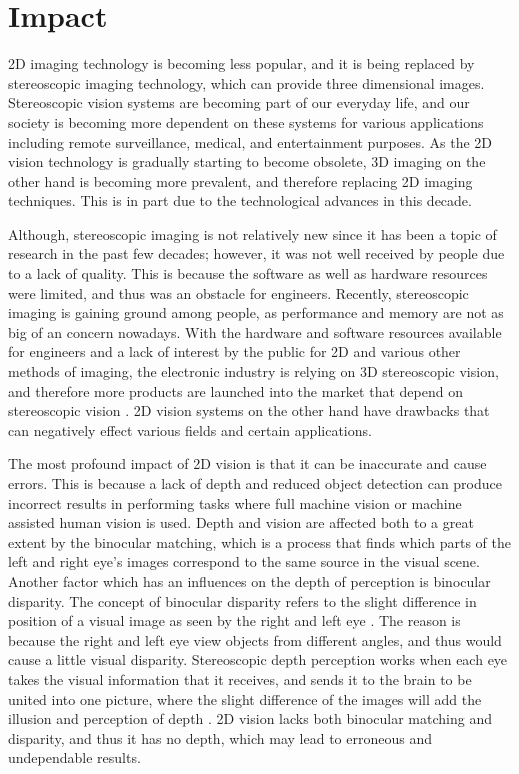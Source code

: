 \documentclass[12pt, journal]{IEEEtran}
\begin{document}
\section{Impact}
2D imaging technology is becoming less popular, and it is being replaced by stereoscopic imaging technology, which can provide three dimensional images. Stereoscopic vision systems are becoming part of our everyday life, and our society is becoming more dependent on these systems for various applications including remote surveillance, medical, and entertainment purposes. As the 2D vision technology is gradually starting to become obsolete, 3D imaging on the other hand is becoming more prevalent, and therefore replacing 2D imaging techniques.  This is in part due to the technological advances in this decade.  

Although, stereoscopic imaging is not relatively new since it has been a topic of research in the past few decades; however, it was not well received by people due to a lack of quality\cite{bryant}. This is because the software as well as hardware resources were limited, and thus was an obstacle for engineers. Recently, stereoscopic imaging is gaining ground among people, as performance and memory are not as big of an concern nowadays. With the hardware and software resources available for engineers and a lack of interest by the public for 2D and various other methods of imaging, the electronic industry is relying on 3D stereoscopic vision, and therefore more products are launched into the market that depend on stereoscopic vision \cite{bryant}. 2D vision systems on the other hand have drawbacks that can negatively effect various fields and certain applications.

The most profound impact of 2D vision is that it can be inaccurate and cause errors. This is because a lack of depth and reduced object detection can produce incorrect results in performing tasks where full machine vision or machine assisted human vision is used.  Depth and vision are affected both to a great extent by the binocular matching, which is a process that finds which parts of the left and right eye’s images correspond to the same source in the visual scene. Another factor which has an influences on the depth of perception is binocular disparity.  The concept of binocular disparity refers to the slight difference in position of a visual image as seen by the right and left eye \cite{naquet}. The reason is because the right and left eye view objects from different angles, and thus would cause a little visual disparity. Stereoscopic depth perception works when each eye takes the visual information that it receives, and sends it to the brain to be united into one picture, where the slight difference of the images will add the illusion and perception of depth \cite{naquet}. 2D vision lacks both binocular matching and disparity, and thus it has no depth, which may lead to erroneous and undependable results.
\end{document}
